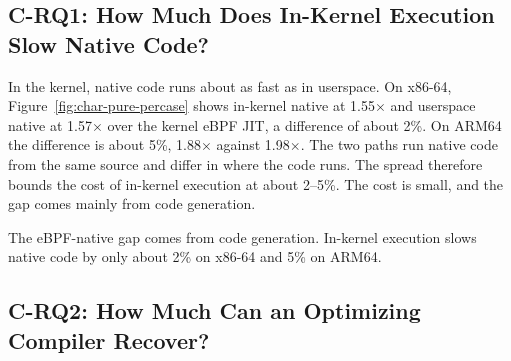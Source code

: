

\subsection{C-RQ1: How Much Does In-Kernel Execution Slow Native Code?}
\label{subsec:gap}

In the kernel, native code runs about as fast as in userspace.
On x86-64, Figure~\ref{fig:char-pure-percase} shows in-kernel native at 1.55$\times$ and userspace native at 1.57$\times$ over the kernel eBPF JIT, a difference of about 2\%.
On ARM64 the difference is about 5\%, 1.88$\times$ against 1.98$\times$.
The two paths run native code from the same source and differ in where the code runs.
The spread therefore bounds the cost of in-kernel execution at about 2--5\%.
The cost is small, and the gap comes mainly from code generation.

\begin{finding}
\finlabel The eBPF-native gap comes from code generation. In-kernel execution slows native code by only about 2\% on x86-64 and 5\% on ARM64.
\end{finding}



\subsection{C-RQ2: How Much Can an Optimizing Compiler Recover?}
\label{subsec:char-jit}

